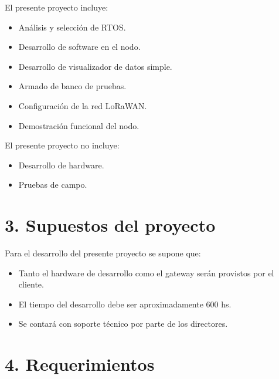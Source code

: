 \documentclass[11pt]{charter}
\begin{document}
El presente proyecto incluye: 

\begin{itemize}
\item Análisis y selección de RTOS.
\item Desarrollo de software en el nodo.
\item Desarrollo de visualizador de datos simple.
\item Armado de banco de pruebas.
\item Configuración de la red LoRaWAN.
\item Demostración funcional del nodo.
\end{itemize}

El presente proyecto no incluye: 
\begin{itemize}
\item Desarrollo de hardware.
\item Pruebas de campo.
\end{itemize}

\section{3. Supuestos del proyecto}
\label{sec:supuestos}

Para el desarrollo del presente proyecto se supone que:

\begin{itemize}
\item Tanto el hardware de desarrollo como el gateway serán provistos por el cliente.
\item El tiempo del desarrollo debe ser aproximadamente 600 hs.
\item Se contará con soporte técnico por parte de los directores.
\end{itemize}

\section{4. Requerimientos}
\label{sec:requerimientos}
\end{document}
